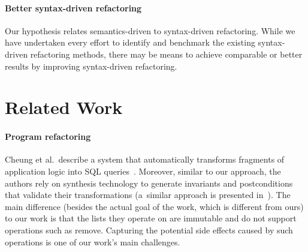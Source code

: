 \documentclass[runningheads,a4paper]{llncs}
\begin{document}
\paragraph{Better syntax-driven refactoring} Our hypothesis relates
semantics-driven to syntax-driven refactoring.  While we have
undertaken every effort to identify and benchmark the existing syntax-driven
refactoring methods, there may be means to achieve comparable or better
results by improving syntax-driven refactoring.

\section{Related Work}

\paragraph{Program refactoring}

Cheung et al.~describe a system that automatically transforms fragments of
application logic into SQL queries~\cite{DBLP:conf/pldi/CheungSM13}. 
Moreover, similar to our approach, the authors rely on synthesis technology
to generate invariants and postconditions that validate their
transformations (a~similar approach is presented
in~\cite{DBLP:conf/cc/IuCZ10}).  The main difference (besides the actual
goal of the work, which is different from ours) to our work is that the
lists they operate on are immutable and do not support operations such as
remove.  Capturing the potential side effects caused by such operations is
one of our work's main challenges.
\end{document}
